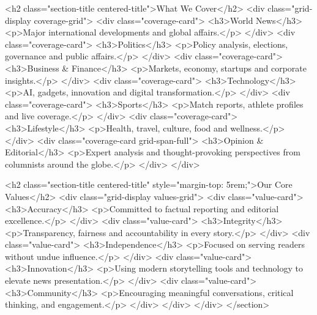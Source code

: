             <h2 class="section-title centered-title">What We Cover</h2>
            <div class="grid-display coverage-grid">
                <div class="coverage-card">
                    <h3>World News</h3>
                    <p>Major international developments and global affairs.</p>
                </div>
                <div class="coverage-card">
                    <h3>Politics</h3>
                    <p>Policy analysis, elections, governance and public affairs.</p>
                </div>
                <div class="coverage-card">
                    <h3>Business & Finance</h3>
                    <p>Markets, economy, startups and corporate insights.</p>
                </div>
                <div class="coverage-card">
                    <h3>Technology</h3>
                    <p>AI, gadgets, innovation and digital transformation.</p>
                </div>
                <div class="coverage-card">
                    <h3>Sports</h3>
                    <p>Match reports, athlete profiles and live coverage.</p>
                </div>
                <div class="coverage-card">
                    <h3>Lifestyle</h3>
                    <p>Health, travel, culture, food and wellness.</p>
                </div>
                <div class="coverage-card grid-span-full">
                    <h3>Opinion & Editorial</h3>
                    <p>Expert analysis and thought-provoking perspectives from columnists around the globe.</p>
                </div>
            </div>

            <h2 class="section-title centered-title" style="margin-top: 5rem;">Our Core Values</h2>
            <div class="grid-display values-grid">
                <div class="value-card">
                    <h3>Accuracy</h3>
                    <p>Committed to factual reporting and editorial excellence.</p>
                </div>
                <div class="value-card">
                    <h3>Integrity</h3>
                    <p>Transparency, fairness and accountability in every story.</p>
                </div>
                <div class="value-card">
                    <h3>Independence</h3>
                    <p>Focused on serving readers without undue influence.</p>
                </div>
                <div class="value-card">
                    <h3>Innovation</h3>
                    <p>Using modern storytelling tools and technology to elevate news presentation.</p>
                </div>
                <div class="value-card">
                    <h3>Community</h3>
                    <p>Encouraging meaningful conversations, critical thinking, and engagement.</p>
                </div>
            </div>
        </div>
    </section>

